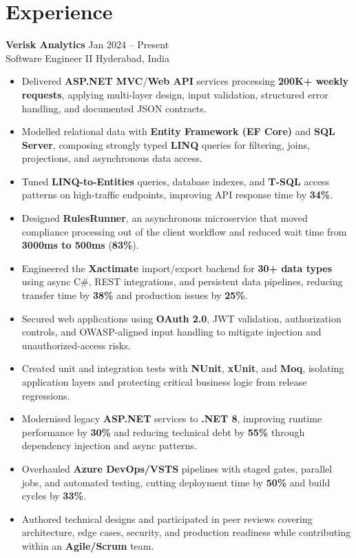\documentclass[10pt,letterpaper]{article}
\newcommand{\resumeSubheading}[4]{%
  \textbf{#1} \hfill #2 \\
  #3 \hfill #4 \\
}
\begin{document}
\section*{Experience}
\resumeSubheading{Verisk Analytics}{Jan 2024 -- Present}{Software Engineer II}{Hyderabad, India}
\begin{itemize}
    \item Delivered \textbf{ASP.NET MVC}/\textbf{Web API} services processing \textbf{200K+ weekly requests}, applying multi-layer design, input validation, structured error handling, and documented JSON contracts.
    \item Modelled relational data with \textbf{Entity Framework (EF Core)} and \textbf{SQL Server}, composing strongly typed \textbf{LINQ} queries for filtering, joins, projections, and asynchronous data access.
    \item Tuned \textbf{LINQ-to-Entities} queries, database indexes, and \textbf{T-SQL} access patterns on high-traffic endpoints, improving API response time by \textbf{34\%}.
    \item Designed \textbf{RulesRunner}, an asynchronous microservice that moved compliance processing out of the client workflow and reduced wait time from \textbf{3000ms to 500ms} (\textbf{83\%}).
    \item Engineered the \textbf{Xactimate} import/export backend for \textbf{30+ data types} using async C\#, REST integrations, and persistent data pipelines, reducing transfer time by \textbf{38\%} and production issues by \textbf{25\%}.
    \item Secured web applications using \textbf{OAuth 2.0}, JWT validation, authorization controls, and OWASP-aligned input handling to mitigate injection and unauthorized-access risks.
    \item Created unit and integration tests with \textbf{NUnit}, \textbf{xUnit}, and \textbf{Moq}, isolating application layers and protecting critical business logic from release regressions.
    \item Modernised legacy \textbf{ASP.NET} services to \textbf{.NET 8}, improving runtime performance by \textbf{30\%} and reducing technical debt by \textbf{55\%} through dependency injection and async patterns.
    \item Overhauled \textbf{Azure DevOps/VSTS} pipelines with staged gates, parallel jobs, and automated testing, cutting deployment time by \textbf{50\%} and build cycles by \textbf{33\%}.
    \item Authored technical designs and participated in peer reviews covering architecture, edge cases, security, and production readiness while contributing within an \textbf{Agile/Scrum} team.
\end{itemize}
\end{document}
